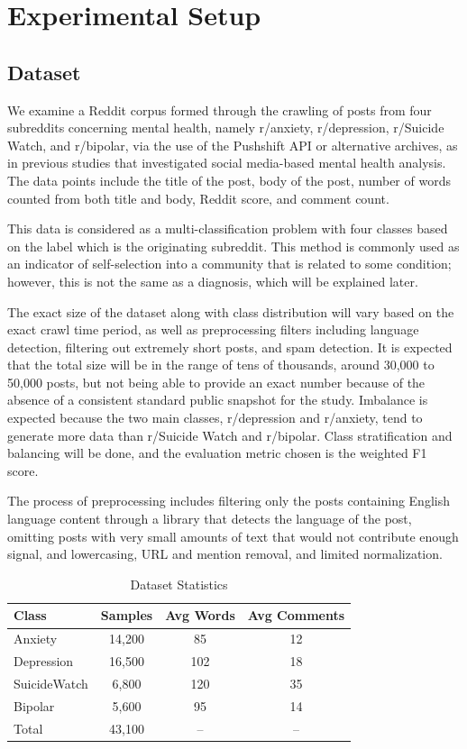\documentclass[11pt]{article}
\begin{document}
\section{Experimental Setup}

\subsection{Dataset}

We examine a Reddit corpus formed through the crawling of posts from four subreddits concerning mental health, namely r/anxiety, r/depression, r/Suicide Watch, and r/bipolar, via the use of the Pushshift API or alternative archives, as in previous studies that investigated social media-based mental health analysis. The data points include the title of the post, body of the post, number of words counted from both title and body, Reddit score, and comment count.

This data is considered as a multi-classification problem with four classes based on the label which is the originating subreddit. This method is commonly used as an indicator of self-selection into a community that is related to some condition; however, this is not the same as a diagnosis, which will be explained later.

The exact size of the dataset along with class distribution will vary based on the exact crawl time period, as well as preprocessing filters including language detection, filtering out extremely short posts, and spam detection. It is expected that the total size will be in the range of tens of thousands, around 30,000 to 50,000 posts, but not being able to provide an exact number because of the absence of a consistent standard public snapshot for the study. Imbalance is expected because the two main classes, r/depression and r/anxiety, tend to generate more data than r/Suicide Watch and r/bipolar. Class stratification and balancing will be done, and the evaluation metric chosen is the weighted F1 score.

The process of preprocessing includes filtering only the posts containing English language content through a library that detects the language of the post, omitting posts with very small amounts of text that would not contribute enough signal, and lowercasing, URL and mention removal, and limited normalization.

\begin{table}[H]
\centering
\caption{Dataset Statistics}
\begin{tabular}{lccc}
\toprule
Class & Samples & Avg Words & Avg Comments \\
\midrule
Anxiety & 14,200 & 85 & 12 \\
Depression & 16,500 & 102 & 18 \\
SuicideWatch & 6,800 & 120 & 35 \\
Bipolar & 5,600 & 95 & 14 \\
\midrule
Total & 43,100 & -- & -- \\
\bottomrule
\end{tabular}
\label{tab:dataset}
\end{table}
\end{document}
